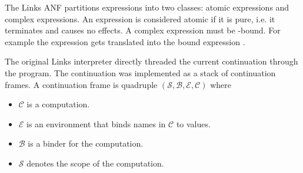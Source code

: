 The Links ANF partitions expressions into two classes: atomic expressions and complex expressions. An expression is considered atomic if it is pure, i.e. it terminates and causes no effects. A complex expression must be -bound. For example the expression  gets translated into the bound expression .


The original Links interpreter directly threaded the current continuation through the program. The continuation was implemented as a stack of continuation frames. A continuation frame is quadruple $(\mathcal{S},\mathcal{B},\mathcal{E},\mathcal{C})$ where
\begin{itemize}
  \item $\mathcal{C}$ is a computation.
  \item $\mathcal{E}$ is an environment that binds names in $\mathcal{C}$ to values.
  \item $\mathcal{B}$ is a binder for the computation.
  \item $\mathcal{S}$ denotes the scope of the computation.
\end{itemize}
